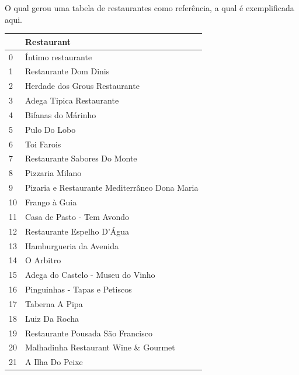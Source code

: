 \documentclass[a4paper,10pt]{article}
\begin{document}
O qual gerou uma tabela de restaurantes como referência, a qual é exemplificada aqui.

\begin{table}[!ht]
  \centering
  \begin{tabular}{|l|l|}
    \hline
    ~  & Restaurant                                    \\ \hline
    0  & Íntimo restaurante                            \\ \hline
    1  & Restaurante Dom Dinis                         \\ \hline
    2  & Herdade dos Grous Restaurante                 \\ \hline
    3  & Adega Tipica Restaurante                      \\ \hline
    4  & Bifanas do Márinho                            \\ \hline
    5  & Pulo Do Lobo                                  \\ \hline
    6  & Toi Farois                                    \\ \hline
    7  & Restaurante Sabores Do Monte                  \\ \hline
    8  & Pizzaria Milano                               \\ \hline
    9  & Pizaria e Restaurante Mediterrâneo Dona Maria \\ \hline
    10 & Frango à Guia                                 \\ \hline
    11 & Casa de Pasto - Tem Avondo                    \\ \hline
    12 & Restaurante Espelho D'Água                    \\ \hline
    13 & Hamburgueria da Avenida                       \\ \hline
    14 & O Arbitro                                     \\ \hline
    15 & Adega do Castelo - Museu do Vinho             \\ \hline
    16 & Pinguinhas - Tapas e Petiscos                 \\ \hline
    17 & Taberna A Pipa                                \\ \hline
    18 & Luiz Da Rocha                                 \\ \hline
    19 & Restaurante Pousada São Francisco             \\ \hline
    20 & Malhadinha Restaurant Wine \& Gourmet         \\ \hline
    21 & A Ilha Do Peixe                               \\ \hline

\end{tabular}
\end{table}
\end{document}
